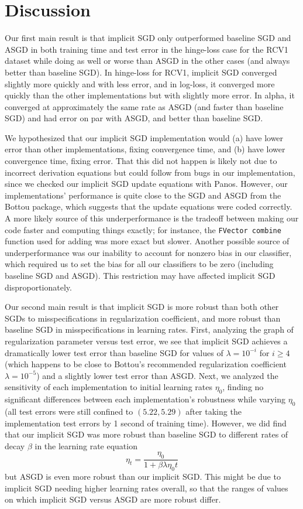 \documentclass{article}
\begin{document}
\section{Discussion}

Our first main result is that implicit SGD only outperformed baseline SGD and ASGD in both training time and test error in the hinge-loss case for the RCV1 dataset while doing as well or worse than ASGD in the other cases (and always better than baseline SGD). In hinge-loss for RCV1, implicit SGD converged slightly more quickly and with less error, and in log-loss, it converged more quickly than the other implementations but with slightly more error. In alpha, it converged at approximately the same rate as ASGD (and faster than baseline SGD) and had error on par with ASGD, and better than baseline SGD.

We hypothesized that our implicit SGD implementation would (a) have lower error than other implementations, fixing convergence time, and (b) have lower convergence time, fixing error. That this did not happen is likely not due to incorrect derivation equations but could follow from bugs in our implementation, since we checked our implicit SGD update equations with Panos. However, our implementations' performance is quite close to the SGD and ASGD from the Bottou package, which suggests that the update equations were coded correctly. A more likely source of this underperformance is the tradeoff between making our code faster and computing things exactly; for instance, the \texttt{FVector combine} function used for adding was more exact but slower. Another possible source of underperformance was our inability to account for nonzero bias in our classifier, which required us to set the bias for all our classifiers to be zero (including baseline SGD and ASGD). This restriction may have affected implicit SGD disproportionately.

Our second main result is that implicit SGD is more robust than both other SGDs to misspecifications in regularization coefficient, and more robust than baseline SGD in misspecifications in learning rates. First, analyzing the graph of regularization parameter versus test error, we see that implicit SGD achieves a dramatically lower test error than baseline SGD for values of $\lambda = 10^{-i}$ for $i \ge 4$ (which happens to be close to Bottou's recommended regularization coefficient $\lambda = 10^{-5}$) and a slightly lower test error than ASGD. Next, we analyzed the sensitivity of each implementation to initial learning rates $\eta_0$, finding no significant differences between each implementation's robustness while varying $\eta_0$ (all test errors were still confined to $(5.22,5.29)$ after taking the implementation test errors by 1 second of training time). However, we did find that our implicit SGD was more robust than baseline SGD to different rates of decay $\beta$ in the learning rate equation $$\eta_t = \frac{\eta_0}{1 + \beta \lambda \eta_0 t}$$ but ASGD is even more robust than our implicit SGD. This might be due to implicit SGD needing higher learning rates overall, so that the ranges of values on which implicit SGD versus ASGD are more robust differ.
\end{document}
